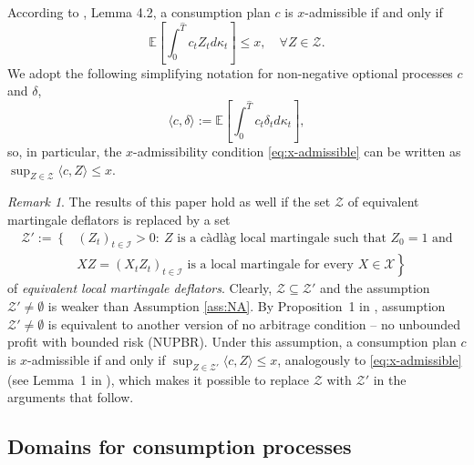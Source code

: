 \documentclass[11pt, oneside]{article}   	%
\theoremstyle{plain}
\theoremstyle{definition}
\theoremstyle{remark}
\newtheorem{rem}[thm]{Remark}
\begin{document}
According to \cite{mostovyi}, Lemma 4.2, a consumption plan $c$ is $x$-admissible if and only if
\begin{equation}\label{eq:x-admissible}
\mathbb{E}\left[\int_0^{\hat{T}} c_tZ_td\kappa_t\right]\leq x,\quad \forall Z\in\mathcal{Z}.
\end{equation}
We adopt the following simplifying notation for non-negative optional processes $c$ and $\delta$,
 $$\langle c,\delta\rangle:=\mathbb{E}\left[\int_0^{\hat{T}} c_t\delta_t d\kappa_t\right],$$
 so, in particular, the $x$-admissibility condition \eqref{eq:x-admissible} can be written as $\sup_{Z\in\mathcal{Z}}\langle c,Z\rangle\leq x$.
 \begin{rem}
 The results of this paper hold as well if the set $\mathcal{Z}$ of equivalent martingale deflators is replaced by a set
 \begin{align*}
\mathcal{Z}':=\left\{\right.&\left.(Z_t)_{t\in\mathcal{I}}>0:\ Z \text{ is a c\`adl\`ag local martingale such that } Z_0=1 \text{ and}\right.\\
&\left. XZ=(X_tZ_t)_{t\in\mathcal{I}} \text{ is a local martingale for every } X\in\mathcal{X}\right\}
\end{align*}
of \textit{equivalent local martingale deflators}. Clearly, $\mathcal{Z}\subseteq\mathcal{Z}'$ and the assumption $\mathcal{Z}'\neq\emptyset$ is weaker than Assumption \ref{ass:NA}. By Proposition~1 in \cite{mostovyiNUPBR}, assumption $\mathcal{Z}'\neq\emptyset$ is equivalent to another version of no arbitrage condition -- no unbounded profit with bounded risk (NUPBR). Under this assumption, a consumption plan $c$ is $x$-admissible if and only if $\sup_{Z\in\mathcal{Z}'}\langle c,Z\rangle\leq x$, analogously to \eqref{eq:x-admissible} (see Lemma~1 in \cite{mostovyiNUPBR}), which makes it possible to replace $\mathcal{Z}$ with $\mathcal{Z}'$ in the arguments that follow.
 \end{rem}


\subsection{Domains for consumption processes}\label{subsec:domains}
\end{document}
